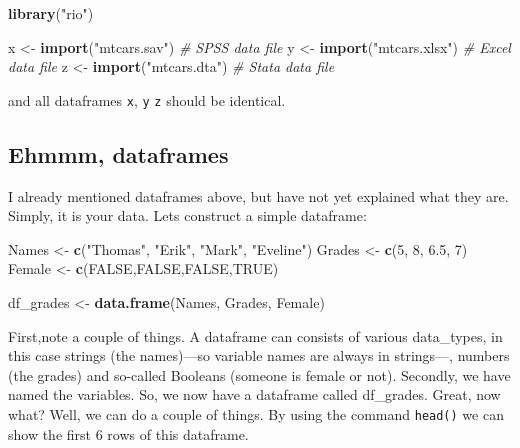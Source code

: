 \documentclass[]{article}
\newenvironment{Shaded}{\begin{snugshade}}{\end{snugshade}}
\newcommand{\KeywordTok}[1]{\textcolor[rgb]{0.13,0.29,0.53}{\textbf{{#1}}}}
\newcommand{\DecValTok}[1]{\textcolor[rgb]{0.00,0.00,0.81}{{#1}}}
\newcommand{\FloatTok}[1]{\textcolor[rgb]{0.00,0.00,0.81}{{#1}}}
\newcommand{\StringTok}[1]{\textcolor[rgb]{0.31,0.60,0.02}{{#1}}}
\newcommand{\CommentTok}[1]{\textcolor[rgb]{0.56,0.35,0.01}{\textit{{#1}}}}
\newcommand{\OtherTok}[1]{\textcolor[rgb]{0.56,0.35,0.01}{{#1}}}
\newcommand{\NormalTok}[1]{{#1}}
\theoremstyle{definition}
\theoremstyle{definition}
\theoremstyle{definition}
\theoremstyle{remark}
\begin{document}
\begin{Shaded}
\begin{Highlighting}[]
\KeywordTok{library}\NormalTok{(}\StringTok{"rio"}\NormalTok{)}

\NormalTok{x <-}\StringTok{ }\KeywordTok{import}\NormalTok{(}\StringTok{"mtcars.sav"}\NormalTok{)  }\CommentTok{# SPSS data file}
\NormalTok{y <-}\StringTok{ }\KeywordTok{import}\NormalTok{(}\StringTok{"mtcars.xlsx"}\NormalTok{) }\CommentTok{# Excel data file}
\NormalTok{z <-}\StringTok{ }\KeywordTok{import}\NormalTok{(}\StringTok{"mtcars.dta"}\NormalTok{)  }\CommentTok{# Stata data file}
\end{Highlighting}
\end{Shaded}

and all dataframes \texttt{x}, \texttt{y} \texttt{z} should be
identical.

\subsection{Ehmmm, dataframes}\label{ehmmm-dataframes}

I already mentioned dataframes above, but have not yet explained what
they are. Simply, it is your data. Lets construct a simple dataframe:

\begin{Shaded}
\begin{Highlighting}[]
\NormalTok{Names  <-}\StringTok{ }\KeywordTok{c}\NormalTok{(}\StringTok{"Thomas"}\NormalTok{, }\StringTok{"Erik"}\NormalTok{, }\StringTok{"Mark"}\NormalTok{, }\StringTok{"Eveline"}\NormalTok{)}
\NormalTok{Grades <-}\StringTok{ }\KeywordTok{c}\NormalTok{(}\DecValTok{5}\NormalTok{, }\DecValTok{8}\NormalTok{, }\FloatTok{6.5}\NormalTok{, }\DecValTok{7}\NormalTok{)}
\NormalTok{Female <-}\StringTok{ }\KeywordTok{c}\NormalTok{(}\OtherTok{FALSE}\NormalTok{,}\OtherTok{FALSE}\NormalTok{,}\OtherTok{FALSE}\NormalTok{,}\OtherTok{TRUE}\NormalTok{)}

\NormalTok{df_grades <-}\StringTok{ }\KeywordTok{data.frame}\NormalTok{(Names, Grades, Female) }
\end{Highlighting}
\end{Shaded}

First,note a couple of things. A dataframe can consists of various
data\_types, in this case strings (the names)---so variable names are
always in strings---, numbers (the grades) and so-called Booleans
(someone is female or not). Secondly, we have named the variables. So,
we now have a dataframe called df\_grades. Great, now what? Well, we can
do a couple of things. By using the command \texttt{head()} we can show
the first 6 rows of this dataframe.
\end{document}
